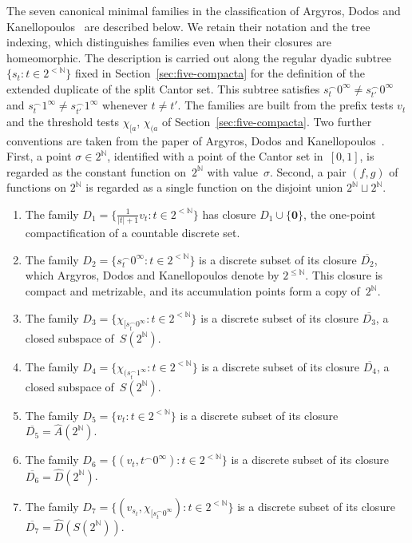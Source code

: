 \documentclass[psamsfonts]{amsart}
\theoremstyle{definition}
\theoremstyle{remark}
\numberwithin{equation}{section}
\begin{document}
The seven canonical minimal families in the classification of Argyros, Dodos and Kanellopoulos~\cite{argyros2008rosenthal} are described below.
We retain their notation and the tree indexing, which distinguishes families even when their closures are homeomorphic.
The description is carried out along the regular dyadic subtree $\{s_t:t\in 2^{<\mathbb{N}}\}$ fixed in Section~\ref{sec:five-compacta} for the definition of the extended duplicate of the split Cantor set.
This subtree satisfies $s_t^\frown 0^{\infty}\neq s_{t'}^\frown 0^\infty$ and $s_t^\frown 1^{\infty}\neq s_{t'}^\frown 1^\infty$ whenever $t\neq t'$.
The families are built from the prefix tests $v_t$ and the threshold tests $\chi_{[a}$, $\chi_{(a}$ of Section~\ref{sec:five-compacta}.
Two further conventions are taken from the paper of Argyros, Dodos and Kanellopoulos~\cite{argyros2008rosenthal}.
First, a point $\sigma\in2^{\mathbb{N}}$, identified with a point of the Cantor set in~$[0,1]$, is regarded as the constant function on~$2^{\mathbb{N}}$ with value~$\sigma$.
Second, a pair $(f,g)$ of functions on $2^{\mathbb{N}}$ is regarded as a single function on the disjoint union $2^{\mathbb{N}}\sqcup2^{\mathbb{N}}$.

\begin{enumerate}
\item
  The family $D_1=\{\frac{1}{|t|+1}v_t:t\in 2^{<\mathbb{N}}\}$ has closure $D_1\cup\{\mathbf{0}\}$, the one-point compactification of a countable discrete set.
\item
  The family $D_2=\{s_t^\frown 0^{\infty}:t\in 2^{<\mathbb{N}}\}$ is a discrete subset of its closure $\overline{D_2}$, which Argyros, Dodos and Kanellopoulos denote by $2^{\leq\mathbb{N}}$.
  This closure is compact and metrizable, and its accumulation points form a copy of~$2^{\mathbb{N}}$.
\item
  The family $D_3=\{\chi_{[s_t^\frown 0^\infty}:t\in 2^{<\mathbb{N}}\}$ is a discrete subset of its closure $\overline{D_3}$, a closed subspace of~$S(2^{\mathbb{N}})$.
\item
  The family $D_4=\{\chi_{(s_t^\frown 1^\infty}:t\in 2^{<\mathbb{N}}\}$ is a discrete subset of its closure $\overline{D_4}$, a closed subspace of~$S(2^{\mathbb{N}})$.
\item
  The family $D_5=\{v_t:t\in 2^{<\mathbb{N}}\}$ is a discrete subset of its closure $\overline{D_5}=\hat{A}(2^{\mathbb{N}})$.
\item
  The family $D_6=\{(v_t,t^\frown 0^\infty):t\in 2^{<\mathbb{N}}\}$ is a discrete subset of its closure $\overline{D_6}=\hat{D}(2^{\mathbb{N}})$.
\item
  The family $D_7=\{(v_{s_t},\chi_{[s_t^\frown 0^\infty}):t\in 2^{<\mathbb{N}}\}$ is a discrete subset of its closure $\overline{D_7}=\hat{D}(S(2^{\mathbb{N}}))$.
\end{enumerate}
\end{document}
